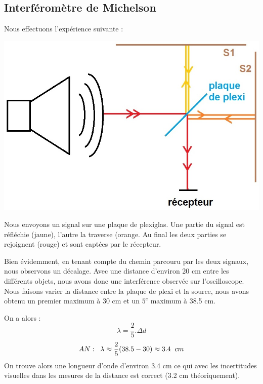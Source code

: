 \documentclass[12pt,a4paper]{article}
\begin{document}
	\subsection{Interféromètre de Michelson}
	
	Nous effectuons l'expérience suivante :
	\begin{multicols}{2}
		\includegraphics[scale=0.3]{schem1}
		\columnbreak
		
		Nous envoyons un signal sur une plaque de plexiglas. Une partie du signal est réfléchie (jaune), l'autre la traverse (orange. Au final les deux parties se rejoignent (rouge) et sont captées par le récepteur.
	\end{multicols}
	Bien évidemment, en tenant compte du chemin parcouru par les deux signaux, nous observons un décalage. Avec une distance d'environ 20 cm entre les différents objets, nous avons donc une interférence observée sur l'oscilloscope. Nous faisons varier la distance entre la plaque de plexi et la source, nous avons obtenu un premier maximum à 30 cm et un $5^e$ maximum à 38.5 cm.
	
	On a alors : 
	$$\lambda = \frac{2}{5}.\Delta d$$
	$$AN :\hspace{0.2cm} \lambda \approx \frac{2}{5}( 38.5 - 30) \approx 3.4 \hspace{0.2cm} cm$$
	On trouve alors une longueur d'onde d'environ 3.4 cm ce qui avec les incertitudes visuelles dans les mesures de la distance est correct (3.2 cm théoriquement).
	
\end{document}
